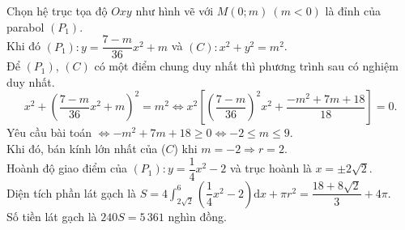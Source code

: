 \begin{bt}
{\begin{center}
		\end{center}
		Chọn hệ trục tọa độ $Oxy$ như hình vẽ với $M(0; m)~(m  < 0)$ là đỉnh của parabol $\left(P_1\right)$.\\
		Khi đó $\left(P_1\right)\colon y=\dfrac{7-m}{36}  x^2+m$ và $(C)\colon x^2+y^2=m^2$.\\
		 Để $\left(P_1\right)$, $(C)$ có một điểm chung duy nhất thì phương trình sau có nghiệm duy nhất.
		\[x^2+\left(\dfrac{7-m}{36} x^2+m\right)^2=m^2\Leftrightarrow x^2\left[\left(\dfrac{7-m}{36}\right)^2x^2+\dfrac{-m^2+7m+18}{18}\right]=0.\] 
		Yêu cầu bài toán $\Leftrightarrow-m^2+7m+18\geq 0\Leftrightarrow-2\leq m \leq  9$.\\
		Khi đó, bán kính lớn nhất của ($C$) khi $m=-2\Rightarrow  r=2$.\\
		 Hoành độ giao điểm của $\left(P_1\right)\colon y=\dfrac{1}{4} x^2-2$ và trục hoành là $x=\pm 2\sqrt{2}$.\\
		Diện tích phần lát gạch là $S=4\displaystyle\int_{2\sqrt{2}}^6\left(\dfrac{1}{4} x^2-2\right)\mathrm{d}  x+\pi r^2=\dfrac{18+8\sqrt{2}}{3}+4\pi$.\\
		Số tiền  lát gạch là $240S=5\,361$ nghìn đồng.
	} 
\end{bt}

